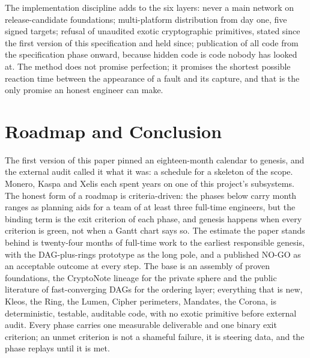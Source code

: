 The implementation discipline adds to the six layers: never a main
network on release-candidate foundations; multi-platform distribution
from day one, five signed targets; refusal of unaudited exotic
cryptographic primitives, stated since the first version of this
specification and held since; publication of all code from the
specification phase onward, because hidden code is code nobody has
looked at. The method does not promise perfection; it promises the
shortest possible reaction time between the appearance of a fault and
its capture, and that is the only promise an honest engineer can make.

\section{Roadmap and Conclusion}\label{sec:roadmap}

The first version of this paper pinned an eighteen-month calendar to
genesis, and the external audit called it what it was: a schedule for a
skeleton of the scope. Monero, Kaspa and Xelis each spent years on one
of this project's subsystems. The honest form of a roadmap is
criteria-driven: the phases below carry month ranges as planning aids
for a team of at least three full-time engineers, but the binding term
is the exit criterion of each phase, and genesis happens when every
criterion is green, not when a Gantt chart says so. The estimate the
paper stands behind is twenty-four months of full-time work to the
earliest responsible genesis, with the DAG-plus-rings prototype as the
long pole, and a published NO-GO as an acceptable outcome at every
step. The base is an assembly of proven foundations, the CryptoNote
lineage for the private sphere and the public literature of
fast-converging DAGs for the ordering layer; everything that is new,
Kleos, the Ring, the Lumen, Cipher perimeters, Mandates, the Corona, is
deterministic, testable, auditable code, with no exotic primitive
before external audit. Every phase carries one measurable deliverable
and one binary exit criterion; an unmet criterion is not a shameful
failure, it is steering data, and the phase replays until it is met.

